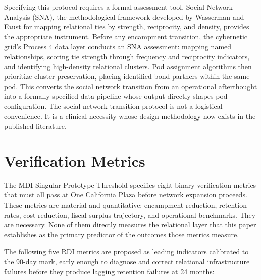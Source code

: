 \documentclass[12pt, letterpaper]{article}
\begin{document}
Specifying this protocol requires a formal assessment tool. Social Network Analysis (SNA), the methodological framework developed by Wasserman and Faust for mapping relational ties by strength, reciprocity, and density, provides the appropriate instrument. Before any encampment transition, the cybernetic grid's Process 4 data layer conducts an SNA assessment: mapping named relationships, scoring tie strength through frequency and reciprocity indicators, and identifying high-density relational clusters. Pod assignment algorithms then prioritize cluster preservation, placing identified bond partners within the same pod. This converts the social network transition from an operational afterthought into a formally specified data pipeline whose output directly shapes pod configuration. The social network transition protocol is not a logistical convenience. It is a clinical necessity whose design methodology now exists in the published literature.

\clearpage
\section{Verification Metrics}

The MDI Singular Prototype Threshold specifies eight binary verification metrics that must all pass at One California Plaza before network expansion proceeds. These metrics are material and quantitative: encampment reduction, retention rates, cost reduction, fiscal surplus trajectory, and operational benchmarks. They are necessary. None of them directly measures the relational layer that this paper establishes as the primary predictor of the outcomes those metrics measure.

The following five RDI metrics are proposed as leading indicators calibrated to the 90-day mark, early enough to diagnose and correct relational infrastructure failures before they produce lagging retention failures at 24 months:
\end{document}
